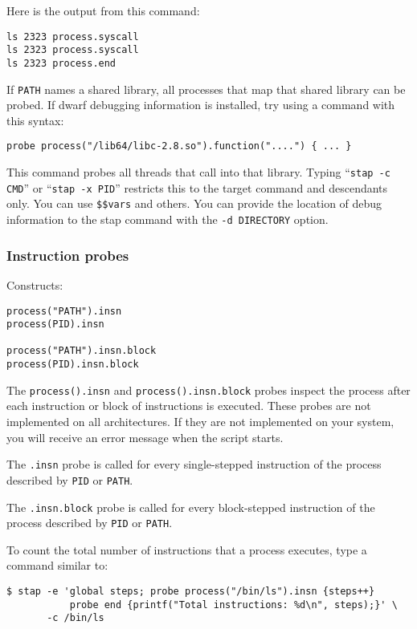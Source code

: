 \documentclass[twoside,english]{article}
\newenvironment{vindent}
{\begin{list}{}{\setlength{\listparindent}{6pt}}
\item[]}
{\end{list}}
\begin{document}
Here is the output from this command:
\begin{vindent}
\begin{verbatim}
ls 2323 process.syscall
ls 2323 process.syscall
ls 2323 process.end
\end{verbatim}
\end{vindent}

If \texttt{PATH} names a shared library, all processes that map that
shared library can be probed.  If dwarf debugging information is
installed, try using a command with this syntax:
\begin{vindent}
\begin{verbatim}
probe process("/lib64/libc-2.8.so").function("....") { ... }
\end{verbatim}
\end{vindent}
This command probes all threads that call into that library.  Typing
``\texttt{stap -c CMD}'' or ``\texttt{stap -x PID}'' restricts this to
the target command and descendants only.  You can use
\texttt{\$\$vars} and others. You can provide the location of debug
information to the stap command with the \texttt{-d DIRECTORY} option.

\subsubsection{Instruction probes}
\label{sec:insnprobes}
Constructs:
\begin{vindent}
\begin{verbatim}
process("PATH").insn
process(PID).insn

process("PATH").insn.block
process(PID).insn.block
\end{verbatim}
\end{vindent}
The \texttt{process().insn} and \texttt{process().insn.block} probes
inspect the process after each instruction or block of instructions is
executed. These probes are not implemented on all architectures. If
they are not implemented on your system, you will receive an error
message when the script starts.

The \texttt{.insn} probe is called for every single-stepped
instruction of the process described by \texttt{PID} or \texttt{PATH}.

The \texttt{.insn.block} probe is called for every block-stepped
instruction of the process described by \texttt{PID} or \texttt{PATH}.

To count the total number of instructions that a process executes,
type a command similar to:
\begin{vindent}
\begin{verbatim}
$ stap -e 'global steps; probe process("/bin/ls").insn {steps++}
           probe end {printf("Total instructions: %d\n", steps);}' \
       -c /bin/ls
\end{verbatim}
\end{vindent}
\end{document}
